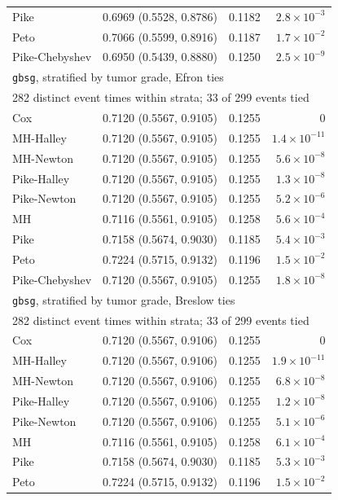 \begin{longtable}{llrr}
Pike & 0.6969 (0.5528, 0.8786) & 0.1182 & $2.8 \times 10^{-3}$ \\
Peto & 0.7066 (0.5599, 0.8916) & 0.1187 & $1.7 \times 10^{-2}$ \\
Pike-Chebyshev & 0.6950 (0.5439, 0.8880) & 0.1250 & $2.5 \times 10^{-9}$ \\
\multicolumn{4}{l}{\texttt{gbsg}, stratified by tumor grade, Efron ties} \\
\multicolumn{4}{l}{282 distinct event times within strata; 33 of 299 events tied} \\
Cox & 0.7120 (0.5567, 0.9105) & 0.1255 & $0$ \\
MH-Halley & 0.7120 (0.5567, 0.9105) & 0.1255 & $1.4 \times 10^{-11}$ \\
MH-Newton & 0.7120 (0.5567, 0.9105) & 0.1255 & $5.6 \times 10^{-8}$ \\
Pike-Halley & 0.7120 (0.5567, 0.9105) & 0.1255 & $1.3 \times 10^{-8}$ \\
Pike-Newton & 0.7120 (0.5567, 0.9105) & 0.1255 & $5.2 \times 10^{-6}$ \\
MH & 0.7116 (0.5561, 0.9105) & 0.1258 & $5.6 \times 10^{-4}$ \\
Pike & 0.7158 (0.5674, 0.9030) & 0.1185 & $5.4 \times 10^{-3}$ \\
Peto & 0.7224 (0.5715, 0.9132) & 0.1196 & $1.5 \times 10^{-2}$ \\
Pike-Chebyshev & 0.7120 (0.5567, 0.9105) & 0.1255 & $1.8 \times 10^{-8}$ \\
\multicolumn{4}{l}{\texttt{gbsg}, stratified by tumor grade, Breslow ties} \\
\multicolumn{4}{l}{282 distinct event times within strata; 33 of 299 events tied} \\
Cox & 0.7120 (0.5567, 0.9106) & 0.1255 & $0$ \\
MH-Halley & 0.7120 (0.5567, 0.9106) & 0.1255 & $1.9 \times 10^{-11}$ \\
MH-Newton & 0.7120 (0.5567, 0.9106) & 0.1255 & $6.8 \times 10^{-8}$ \\
Pike-Halley & 0.7120 (0.5567, 0.9106) & 0.1255 & $1.2 \times 10^{-8}$ \\
Pike-Newton & 0.7120 (0.5567, 0.9106) & 0.1255 & $5.1 \times 10^{-6}$ \\
MH & 0.7116 (0.5561, 0.9105) & 0.1258 & $6.1 \times 10^{-4}$ \\
Pike & 0.7158 (0.5674, 0.9030) & 0.1185 & $5.3 \times 10^{-3}$ \\
Peto & 0.7224 (0.5715, 0.9132) & 0.1196 & $1.5 \times 10^{-2}$ \\

\end{longtable}
